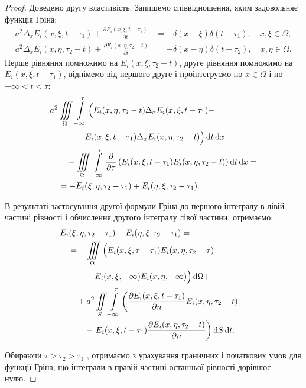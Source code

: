 \begin{proof}
	Доведемо другу властивість. Запишемо співвідношення, яким задовольняє функція Гріна:
	\begin{align}
		a^2 \Delta_x E_i(x, \xi, t - \tau_1) + \frac{\partial E_i(x, \xi, t - \tau_1)}{\partial t} &= - \delta(x - \xi) \delta (t - \tau_1), \quad x, \xi \in \Omega, \\
		a^2 \Delta_x E_i(x, \eta, \tau_2 - t) + \frac{\partial E_i(x, \eta, \tau_2 - t)}{\partial t} &= - \delta(x - \eta) \delta (t - \tau_2), \quad x, \eta \in \Omega.
	\end{align}
	Перше рівняння помножимо на $E_i(x, \xi, \tau_2 - t)$, друге рівняння помножимо на $E_i(x, \xi, t - \tau_1)$, віднімемо від першого друге і проінтегруємо по $x \in \Omega$ і по $-\infty < t < \tau$:
	\begin{equation}
		\begin{aligned}
			& a^2 \displaystyle\iiint\limits_\Omega \displaystyle\int\limits_{-\infty}^\tau \Big( E_i(x, \eta, \tau_2 - t) \Delta_x E_i(x, \xi, t - \tau_1) - \\
			& \qquad \quad - E_i(x, \xi, t - \tau_1) \Delta_x E_i(x, \eta, \tau_2 - t) \Big) \mathop{}\!\mathrm{d} t \mathop{}\!\mathrm{d} x - \\
			& \qquad - \displaystyle\iiint\limits_\Omega \displaystyle\int\limits_{-\infty}^\tau \frac{\partial}{\partial \tau} \left( E_i(x, \xi, t - \tau_1) E_i(x, \eta, \tau_2 - t) \right) \mathop{}\!\mathrm{d} t \mathop{}\!\mathrm{d} x = \\
			& \quad = - E_i(\xi, \eta, \tau_2 - \tau_1) + E_i(\eta, \xi, \tau_2 - \tau_1).
		\end{aligned}
	\end{equation}

	В результаті застосування другої формули Гріна до першого інтегралу в лівій частині рівності і обчислення другого інтегралу лівої частини, отримаємо:
	\begin{equation}
		\begin{aligned}
			& E_i(\xi, \eta, \tau_2 - \tau_1 ) - E_i(\eta, \xi, \tau_2 - \tau_1) = \\
			& \quad = - \displaystyle\iiint\limits_\Omega \Big( E_i(x, \xi, \tau - \tau_1) E_i(x, \eta, \tau_2 - \tau) - \\
			& \qquad \quad - E_i(x, \xi, -\infty) E_i(x, \eta, -\infty) \Big) \mathop{}\!\mathrm{d} \Omega + \\
			& \qquad + a^2 \displaystyle\iint\limits_S \displaystyle\int\limits_{-\infty}^\tau \left( \frac{\partial E_i(x, \xi, t - \tau_1)}{\partial n} E_i(x, \eta, \tau_2 - t) \right. - \\
			& \qquad \quad - \left. E_i(x, \xi, t - \tau_1) \frac{\partial E_i(x, \eta, \tau_2 - t)}{\partial n} \right) \mathop{}\!\mathrm{d} S \mathop{}\!\mathrm{d} t.
		\end{aligned}
	\end{equation}

	Обираючи $\tau > \tau_2 > \tau_1$ , отримаємо з урахування граничних і початкових умов для функції Гріна, що інтеграли в правій частині останньої рівності дорівнює нулю.
\end{proof}

